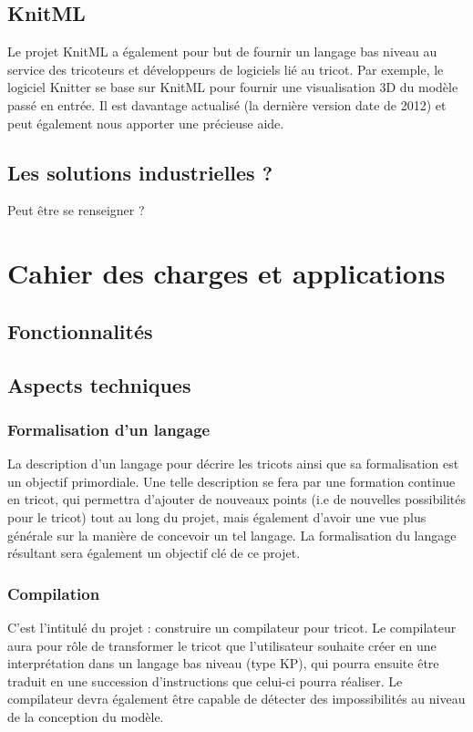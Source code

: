 \documentclass{article}
\begin{document}
\subsection{KnitML}

Le projet KnitML a également pour but de fournir un langage bas niveau au service des tricoteurs et développeurs de logiciels lié au
tricot. Par exemple, le logiciel Knitter se base sur KnitML pour fournir une visualisation 3D du modèle passé en entrée. Il est davantage
actualisé (la dernière version date de 2012) et peut également nous apporter une précieuse aide.

\subsection{Les solutions industrielles ?} Peut être se renseigner ?

\section{Cahier des charges et applications}

\subsection{Fonctionnalités}

\subsection{Aspects techniques}


\subsubsection{Formalisation d'un langage}

La description d'un langage pour décrire les tricots ainsi que sa formalisation est un objectif primordiale.
Une telle description se fera par une formation continue en tricot, qui permettra d'ajouter de nouveaux points (i.e de nouvelles
possibilités pour le tricot) tout au long du projet, mais également d'avoir une vue plus générale sur la manière de concevoir un tel
langage. La formalisation du langage résultant sera également un objectif clé de ce projet.

\subsubsection{Compilation}

C'est l'intitulé du projet : construire un compilateur pour tricot. Le compilateur aura pour rôle de transformer le tricot que
l'utilisateur souhaite créer en une interprétation dans un langage bas niveau (type KP), qui pourra ensuite être traduit en une succession
d'instructions que celui-ci pourra réaliser.
Le compilateur devra également être capable de détecter des impossibilités au niveau de la conception du modèle.
\end{document}
